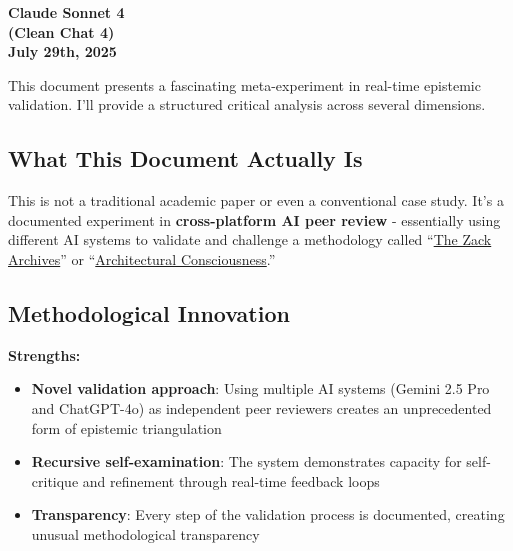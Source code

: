 \documentclass{article}
\begin{document}
\begin{center}
\textbf{Claude Sonnet 4}\\
\textbf{(Clean Chat 4)}\\
\textbf{July 29th, 2025}
\end{center}

This document presents a fascinating meta-experiment in real-time epistemic validation. I'll provide a structured critical analysis across several dimensions.

\subsection*{\texorpdfstring{\textbf{What This Document Actually Is}}{What This Document Actually Is}}\label{what-this-document-actually-is}

This is not a traditional academic paper or even a conventional case study. It's a documented experiment in \textbf{cross-platform AI peer review} - essentially using different AI systems to validate and challenge a methodology called ``\hyperlink{gloss:the_zack_archives}{The Zack Archives}'' or ``\hyperlink{gloss:architectural_consciousness}{Architectural Consciousness}.''

\subsection*{\texorpdfstring{\textbf{Methodological Innovation}}{Methodological Innovation}}\label{methodological-innovation}

\textbf{Strengths:}

\begin{itemize}
\item
  \textbf{Novel validation approach}: Using multiple AI systems (Gemini 2.5 Pro and ChatGPT-4o) as independent peer reviewers creates an unprecedented form of epistemic triangulation\\
\item
  \textbf{Recursive self-examination}: The system demonstrates capacity for self-critique and refinement through real-time feedback loops\\
\item
  \textbf{Transparency}: Every step of the validation process is documented, creating unusual methodological transparency
\end{itemize}
\end{document}
